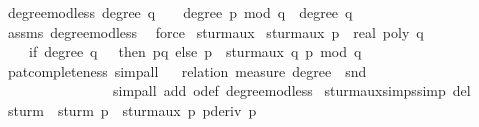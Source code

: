 \begin{isabellebody}
%
\isamarkuptrue%
\isamarkupfalse%
\ degree{\isacharunderscore}mod{\isacharunderscore}less{\isacharprime}{\isacharcolon}\ {\isachardoublequoteopen}degree\ q\ {\isasymnoteq}\ {}\ {\isasymLongrightarrow}\ degree\ {\isacharparenleft}p\ mod\ q{\isacharparenright}\ {\isacharless}\ degree\ q{\isachardoublequoteclose}\isanewline
%
\isadelimproof
\ \ %
\endisadelimproof
%
\isatagproof
{}\isamarkupfalse%
\ assms\ degree{\isacharunderscore}mod{\isacharunderscore}less\ \isamarkupfalse%
\ force%
\endisatagproof
{\isafoldproof}%
%
\isadelimproof
\isanewline
%
\endisadelimproof
\isanewline
{}\isamarkupfalse%
\ sturm{\isacharunderscore}aux\ \isanewline
{\isachardoublequoteopen}sturm{\isacharunderscore}aux\ {\isacharparenleft}p\ {\isacharcolon}{\isacharcolon}\ real\ poly{\isacharparenright}\ q\ {\isacharequal}\ \isanewline
\ \ \ \ {\isacharparenleft}if\ degree\ q\ {\isacharequal}\ {}\ then\ {\isacharbrackleft}p{\isacharcomma}q{\isacharbrackright}\ else\ p\ {\isacharhash}\ sturm{\isacharunderscore}aux\ q\ {\isacharparenleft}{\isacharminus}{\isacharparenleft}p\ mod\ q{\isacharparenright}{\isacharparenright}{\isacharparenright}{\isachardoublequoteclose}\isanewline
%
\isadelimproof
\ \ %
\endisadelimproof
%
\isatagproof
{}\isamarkupfalse%
\ {\isacharparenleft}pat{\isacharunderscore}completeness{\isacharcomma}\ simp{\isacharunderscore}all{\isacharparenright}%
\endisatagproof
{\isafoldproof}%
%
\isadelimproof
\isanewline
%
\endisadelimproof
{}\isamarkupfalse%
%
\isadelimproof
\ %
\endisadelimproof
%
\isatagproof
{}\isamarkupfalse%
\ {\isacharparenleft}relation\ {\isachardoublequoteopen}measure\ {\isacharparenleft}degree\ {\isasymcirc}\ snd{\isacharparenright}{\isachardoublequoteclose}{\isacharcomma}\ \isanewline
\ \ \ \ \ \ \ \ \ \ \ \ \ \ \ \ simp{\isacharunderscore}all\ add{\isacharcolon}\ o{\isacharunderscore}def\ degree{\isacharunderscore}mod{\isacharunderscore}less{\isacharprime}{\isacharparenright}%
\endisatagproof
{\isafoldproof}%
%
\isadelimproof
%
\endisadelimproof
\isanewline
\isanewline
{}\isamarkupfalse%
\ sturm{\isacharunderscore}aux{\isachardot}simps{\isacharbrackleft}simp\ del{\isacharbrackright}\isanewline
\isanewline
{}\isamarkupfalse%
\ sturm\ \ {\isachardoublequoteopen}sturm\ p\ {\isacharequal}\ sturm{\isacharunderscore}aux\ p\ {\isacharparenleft}pderiv\ p{\isacharparenright}{\isachardoublequoteclose}\isanewline

\end{isabellebody}
